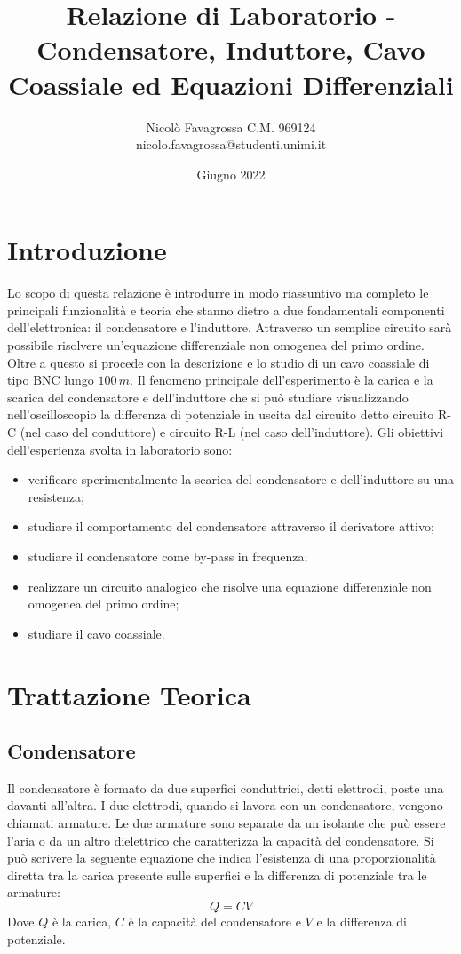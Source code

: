 \documentclass[11pt]{article}
\title{Relazione di Laboratorio - Condensatore, Induttore, Cavo Coassiale ed Equazioni Differenziali}
\author{Nicolò Favagrossa C.M. 969124\\nicolo.favagrossa@studenti.unimi.it\\}
\date{Giugno 2022}
\begin{document}
\maketitle
\newpage
\tableofcontents
\newpage
\section{Introduzione}
Lo scopo di questa relazione è introdurre in modo riassuntivo ma completo le principali funzionalità e teoria che stanno dietro a due fondamentali componenti dell'elettronica: il condensatore e l'induttore. Attraverso un semplice circuito sarà possibile risolvere un'equazione differenziale non omogenea del primo ordine. Oltre a questo si procede con la descrizione e lo studio di un cavo coassiale di tipo BNC lungo $100\,m$. Il fenomeno principale dell'esperimento è la carica e la scarica del condensatore e dell'induttore che si può studiare visualizzando nell'oscilloscopio la differenza di potenziale in uscita dal circuito detto circuito R-C (nel caso del conduttore) e circuito R-L (nel caso dell'induttore). Gli obiettivi dell'esperienza svolta in laboratorio sono:
\begin{itemize}
    \item verificare sperimentalmente la scarica del condensatore e dell'induttore su una resistenza;
    \item studiare il comportamento del condensatore attraverso il derivatore attivo;
    \item studiare il condensatore come by-pass in frequenza;
    \item realizzare un circuito analogico che risolve una equazione differenziale non omogenea del primo ordine;
    \item studiare il cavo coassiale.
\end{itemize}
\section{Trattazione Teorica}
\subsection{Condensatore}
Il condensatore è formato da due superfici conduttrici, detti elettrodi, poste una davanti all'altra. I due elettrodi, quando si lavora con un condensatore, vengono chiamati armature. Le due armature sono separate da un isolante che può essere l'aria o da un altro dielettrico che caratterizza la capacità del condensatore. Si può scrivere la seguente equazione che indica l'esistenza di una proporzionalità diretta tra la carica presente sulle superfici e la differenza di potenziale tra le armature:
\begin{equation}
    Q=CV
    \label{qcv}
\end{equation}
Dove $Q$ è la carica, $C$ è la capacità del condensatore e $V$ e la differenza di potenziale. 
\end{document}
